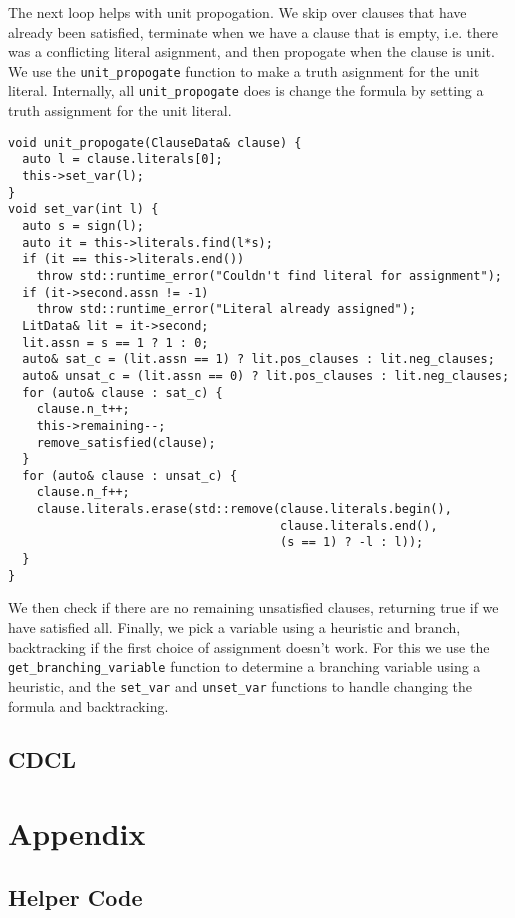 \documentclass[10pt,AMS Euler]{article}
\begin{document}
The next loop helps with unit propogation. We skip over clauses that have
already been satisfied, terminate when we have a clause that is empty,
i.e. there was a conflicting literal asignment, and then propogate
when the clause is unit. We use the \texttt{unit\_propogate} function to
make a truth asignment for the unit literal. Internally, all \texttt{unit\_propogate}
does is change the formula by setting a truth assignment for the unit
literal.
\begin{verbatim}
void unit_propogate(ClauseData& clause) {
  auto l = clause.literals[0];
  this->set_var(l);
}
void set_var(int l) {
  auto s = sign(l);
  auto it = this->literals.find(l*s);
  if (it == this->literals.end())
    throw std::runtime_error("Couldn't find literal for assignment");
  if (it->second.assn != -1)
    throw std::runtime_error("Literal already assigned");
  LitData& lit = it->second;
  lit.assn = s == 1 ? 1 : 0;
  auto& sat_c = (lit.assn == 1) ? lit.pos_clauses : lit.neg_clauses;
  auto& unsat_c = (lit.assn == 0) ? lit.pos_clauses : lit.neg_clauses;
  for (auto& clause : sat_c) {
    clause.n_t++;
    this->remaining--;
    remove_satisfied(clause);
  }
  for (auto& clause : unsat_c) {
    clause.n_f++;
    clause.literals.erase(std::remove(clause.literals.begin(),
                                      clause.literals.end(),
                                      (s == 1) ? -l : l));
  }
}
\end{verbatim}

We then check if there are no remaining unsatisfied clauses, returning true
if we have satisfied all. Finally, we pick a variable using a heuristic
and branch, backtracking if the first choice of assignment doesn't work.
For this we use the \texttt{get\_branching\_variable} function to determine
a branching variable using a heuristic, and the \texttt{set\_var} and \texttt{unset\_var}
functions to handle changing the formula and backtracking.

\subsection*{CDCL}
\label{sec:org63ac0db}
\section*{Appendix}
\label{sec:org5b160e7}
\subsection*{Helper Code}
\label{sec:orgaeb53b2}
\end{document}

